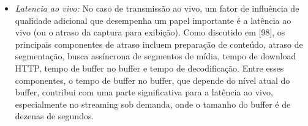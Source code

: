 \begin{itemize}
\item \textit{Latencia ao vivo:} No caso de transmissão ao vivo, um fator de influência de qualidade adicional que desempenha um papel importante é a latência ao vivo (ou o atraso da captura para exibição). Como discutido em [98], os principais componentes de atraso incluem preparação de conteúdo, atraso de segmentação, busca assíncrona de segmentos de mídia, tempo de download HTTP, tempo de buffer no buffer e tempo de decodificação. Entre esses componentes, o tempo de buffer no buffer, que depende do nível atual do buffer, contribui com uma parte significativa para a latência ao vivo, especialmente no streaming sob demanda, onde o tamanho do buffer é de dezenas de segundos.

\end{itemize}

